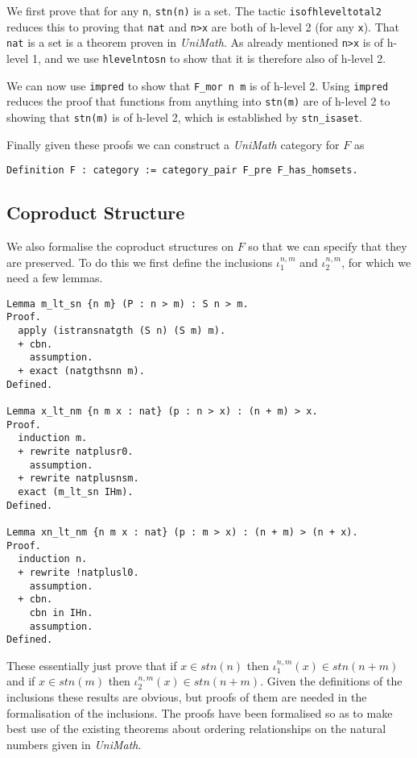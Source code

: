 We first prove that for any \lstinline|n|, \lstinline|stn(n)| is a set. The tactic
\lstinline|isofhleveltotal2| reduces this to proving that \lstinline|nat| and \lstinline|n>x|
are both of h-level 2 (for any \lstinline|x|). That \lstinline|nat| is a set is a theorem
proven in \textit{UniMath}. As already mentioned \lstinline|n>x| is of h-level 1, and
we use \lstinline|hlevelntosn| to show that it is therefore also of h-level 2.

We can now use \lstinline|impred| to show that \lstinline|F_mor n m| is of h-level 2.
Using \lstinline|impred| reduces the proof that functions from anything into
\lstinline|stn(m)| are of h-level 2 to showing that \lstinline|stn(m)| is of h-level 2,
which is established by \lstinline|stn_isaset|.

Finally given these proofs we can construct a \textit{UniMath} category for $F$
as
\begin{lstlisting}
Definition F : category := category_pair F_pre F_has_homsets.
\end{lstlisting}

\subsection{Coproduct Structure}
We also formalise the coproduct structures on $F$ so that we can specify that
they are preserved. To do this we first define the inclusions $\iota_1^{n,m}$
and $\iota_2^{n,m}$, for which we need a few lemmas.

\begin{lstlisting}
Lemma m_lt_sn {n m} (P : n > m) : S n > m.
Proof.
  apply (istransnatgth (S n) (S m) m).
  + cbn.
    assumption.
  + exact (natgthsnn m).
Defined.

Lemma x_lt_nm {n m x : nat} (p : n > x) : (n + m) > x.
Proof.
  induction m.
  + rewrite natplusr0.
    assumption.
  + rewrite natplusnsm.
  exact (m_lt_sn IHm).
Defined.

Lemma xn_lt_nm {n m x : nat} (p : m > x) : (n + m) > (n + x).
Proof.
  induction n.
  + rewrite !natplusl0.
    assumption.
  + cbn.
    cbn in IHn.
    assumption.
Defined.
\end{lstlisting}

These essentially just prove that if $x\in stn(n)$ then $\iota_1^{n,m}(x) \in
stn(n+m)$ and if $x\in stn(m)$ then $\iota_2^{n,m}(x)\in stn(n+m)$. Given the
definitions of the inclusions these results are obvious, but proofs of them are
needed in the formalisation of the inclusions. The proofs have been formalised
so as to make best use of the existing theorems about ordering relationships on
the natural numbers given in \textit{UniMath}.

